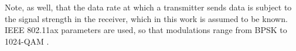 \documentclass[preprint,12pt]{elsarticle}
\begin{document}
Note, as well, that the data rate at which a transmitter sends data is subject to the signal strength in the receiver, which in this work is assumed to be known. IEEE 802.11ax parameters are used, so that modulations range from BPSK to 1024-QAM \cite{ieee2015qam}.
%
\end{document}
